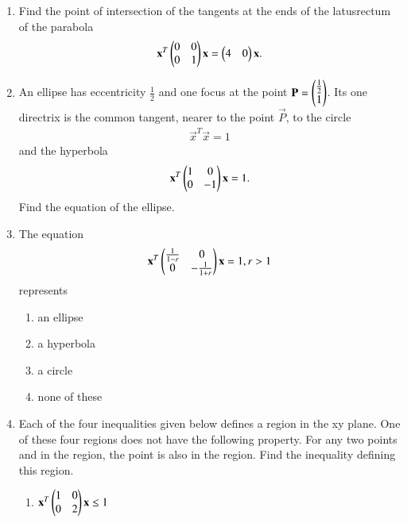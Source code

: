 \renewcommand{\theequation}{\theenumi}
\begin{enumerate}[label=\arabic*.,ref=\thesubsection.\theenumi]

\item Find the point of intersection of the tangents at the ends of the latusrectum of the parabola
\begin{align} 
\mathbf {x}^T \begin{pmatrix}0 & 0 \\ 0 & 1\end{pmatrix} \mathbf {x}=\begin{pmatrix}4&0\end{pmatrix}\mathbf {x}.
\end{align} 
\item An ellipse has eccentricity $\frac{1}{2}$ and one focus at the point $\mathbf{P}=\begin{pmatrix}\frac{1}{2}\\1\end{pmatrix}$. Its one directrix is the common tangent, nearer to the point $\vec{P}$, to the circle 
    \begin{align}
    \vec {x}^T \vec {x} =1
    \end{align} and the hyperbola 
    \begin{align}
    \mathbf {x}^T \begin{pmatrix}1& 0 \\0 &-1\end{pmatrix}\mathbf {x}=1.
    \end{align} Find the equation of the ellipse.
\item The equation 
    \begin{align}
    \mathbf {x}^T \begin{pmatrix}\frac{1}{1-r} & 0 \\ 0 &-\frac {1}{1+r}\end{pmatrix}\mathbf{x} = 1, r>1
    \end{align} represents
    \begin{enumerate}
    \item an ellipse
    \item a hyperbola
    \item a circle
    \item none of these
    \end{enumerate} 
    \item Each of the four inequalities given below defines a region in the xy plane. One of these four regions does not have the following property. For any two points  and  in the region, the point  is also in the region. Find the inequality defining this region.
    \begin{enumerate}
    \item $\mathbf {x}^T\begin{pmatrix}1&0 \\0 &2\end{pmatrix}\mathbf {x} \leq1$

\end{enumerate}
\end{enumerate}
